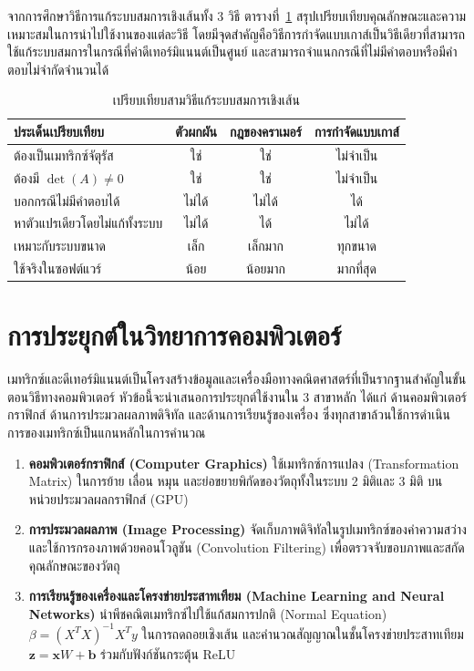 จากการศึกษาวิธีการแก้ระบบสมการเชิงเส้นทั้ง 3 วิธี ตารางที่~\ref{tab:solve-methods} สรุปเปรียบเทียบคุณลักษณะและความเหมาะสมในการนำไปใช้งานของแต่ละวิธี โดยมีจุดสำคัญคือวิธีการกำจัดแบบเกาส์เป็นวิธีเดียวที่สามารถใช้แก้ระบบสมการในกรณีที่ค่าดีเทอร์มิแนนต์เป็นศูนย์ และสามารถจำแนกกรณีที่ไม่มีคำตอบหรือมีคำตอบไม่จำกัดจำนวนได้

\begin{table}[H]
\centering
\caption{เปรียบเทียบสามวิธีแก้ระบบสมการเชิงเส้น}
\label{tab:solve-methods}
\renewcommand{\arraystretch}{1.5}
\begin{tabular}{|l|c|c|c|}
\hline
\textbf{ประเด็นเปรียบเทียบ} & \textbf{ตัวผกผัน} & \textbf{กฎของคราเมอร์} & \textbf{การกำจัดแบบเกาส์} \\
\hline
ต้องเป็นเมทริกซ์จัตุรัส & ใช่ & ใช่ & ไม่จำเป็น \\
ต้องมี $\det(A) \neq 0$ & ใช่ & ใช่ & ไม่จำเป็น \\
บอกกรณีไม่มีคำตอบได้ & ไม่ได้ & ไม่ได้ & ได้ \\
หาตัวแปรเดียวโดยไม่แก้ทั้งระบบ & ไม่ได้ & ได้ & ไม่ได้ \\
เหมาะกับระบบขนาด & เล็ก & เล็กมาก & ทุกขนาด \\
ใช้จริงในซอฟต์แวร์ & น้อย & น้อยมาก & มากที่สุด \\
\hline
\end{tabular}
\end{table}

\section{การประยุกต์ในวิทยาการคอมพิวเตอร์}
\label{sec:matrix-applications}

เมทริกซ์และดีเทอร์มิแนนต์เป็นโครงสร้างข้อมูลและเครื่องมือทางคณิตศาสตร์ที่เป็นรากฐานสำคัญในขั้นตอนวิธีทางคอมพิวเตอร์ หัวข้อนี้จะนำเสนอการประยุกต์ใช้งานใน 3 สาขาหลัก ได้แก่ ด้านคอมพิวเตอร์กราฟิกส์ ด้านการประมวลผลภาพดิจิทัล และด้านการเรียนรู้ของเครื่อง ซึ่งทุกสาขาล้วนใช้การดำเนินการของเมทริกซ์เป็นแกนหลักในการคำนวณ~\parencite{gersting2014structures}
\begin{enumerate}[label=\textbf{\arabic*.}]
    \item \textbf{คอมพิวเตอร์กราฟิกส์ (Computer Graphics)} ใช้เมทริกซ์การแปลง (Transformation Matrix) ในการย้าย เลื่อน หมุน และย่อขยายพิกัดของวัตถุทั้งในระบบ 2 มิติและ 3 มิติ บนหน่วยประมวลผลกราฟิกส์ (GPU)
    \item \textbf{การประมวลผลภาพ (Image Processing)} จัดเก็บภาพดิจิทัลในรูปเมทริกซ์ของค่าความสว่าง และใช้การกรองภาพด้วยคอนโวลูชัน (Convolution Filtering) เพื่อตรวจจับขอบภาพและสกัดคุณลักษณะของวัตถุ
    \item \textbf{การเรียนรู้ของเครื่องและโครงข่ายประสาทเทียม (Machine Learning and Neural Networks)} นำพีชคณิตเมทริกซ์ไปใช้แก้สมการปกติ (Normal Equation) $\beta = (X^T X)^{-1} X^T y$ ในการถดถอยเชิงเส้น และคำนวณสัญญาณในชั้นโครงข่ายประสาทเทียม $\mathbf{z} = \mathbf{x}W + \mathbf{b}$ ร่วมกับฟังก์ชันกระตุ้น ReLU
\end{enumerate}

